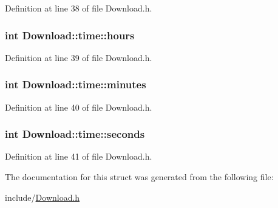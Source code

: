 Definition at line 38 of file Download.h.

\hypertarget{structDownload_1_1time_ab17b2214e46563a3d80ba305f4ea25d6}{
\subsubsection[{hours}]{\setlength{\rightskip}{0pt plus 5cm}int {\bf Download::time::hours}}}
\label{structDownload_1_1time_ab17b2214e46563a3d80ba305f4ea25d6}


Definition at line 39 of file Download.h.

\hypertarget{structDownload_1_1time_a93f04fb31527a0f4a4f35b16052046dc}{
\subsubsection[{minutes}]{\setlength{\rightskip}{0pt plus 5cm}int {\bf Download::time::minutes}}}
\label{structDownload_1_1time_a93f04fb31527a0f4a4f35b16052046dc}


Definition at line 40 of file Download.h.

\hypertarget{structDownload_1_1time_aaf6e3729c5ec9976d90b41caf8f352fd}{
\subsubsection[{seconds}]{\setlength{\rightskip}{0pt plus 5cm}int {\bf Download::time::seconds}}}
\label{structDownload_1_1time_aaf6e3729c5ec9976d90b41caf8f352fd}


Definition at line 41 of file Download.h.



The documentation for this struct was generated from the following file:\begin{DoxyCompactItemize}
\item 
include/\hyperlink{Download_8h}{Download.h}\end{DoxyCompactItemize}
